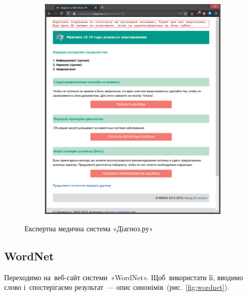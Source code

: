 \documentclass[
  a4paper,
  oneside,
  BCOR = 10mm,
  DIV = 12,
  12pt,
  headings = normal,
]{scrartcl}
\newlength{\gridunitwidth}
\begin{document}
\begin{figure}[!htbp]
\begin{subfigure}[b]{6 \gridunitwidth - 1em /2}
          \caption{}
          \label{subfig:diagnos-ru-03}
        \end{subfigure}%
        \hspace{1em}%
        \begin{subfigure}[b]{6 \gridunitwidth - 1em /2}
          \includegraphics[width = \columnwidth]{./assets/10.png}
          \caption{}
          \label{subfig:diagnos-ru-04}
        \end{subfigure}%
        \caption{Експертна медична система «Діагноз.ру»}
        \label{fig:diagnos-ru}
      \end{figure}

    \subsection{\textenglish{WordNet}}
      Переходимо на~веб-сайт системи~«\textenglish{WordNet}». Щоб~використати її, вводимо слово і~спостерігаємо результат~— опис синонімів~(рис.~\ref{fig:wordnet}).
\end{document}
